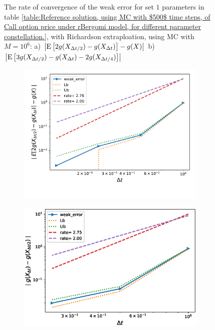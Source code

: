 \documentclass[11pt]{article}
\newcommand{\expt}[1]{\mathrm{E}\left[#1\right]}
\begin{document}
\begin{figure}[h!]
	\caption{The rate of convergence of the weak error for set $1$ parameters in table \ref{table:Reference solution, using MC with $500$ time steps, of Call option price under rBergomi model, for different parameter constellation.}, with Richardson extraploation, using MC with $M=10^6$: a) $\abs{\expt{2 g(X_{\Delta t/2}) -g(X_{\Delta t})}-g(X)}$  b) $\abs{\expt{3 g(X_{\Delta t/2})-g(X_{\Delta t})-2 g(X_{\Delta t/4})}}$ }
	\label{fig:Weak_rate_H_043_with_rich}
\end{figure}

\begin{figure}[h!]
	\centering
	\begin{subfigure}{.4\textwidth}
		\centering
		\includegraphics[width=1\linewidth]{./figures/rBergomi_weak_error_rates/with_richardson/H_007/weak_convergence_order_Bergomi_H_007_K_1_richardson_relative_M_10_6}
		\caption{}
		\label{fig:sub3}
	\end{subfigure}%
	\begin{subfigure}{.4\textwidth}
		\centering
		\includegraphics[width=1\linewidth]{./figures/rBergomi_weak_error_rates/with_richardson/H_007/weak_convergence_order_differences_Bergomi_H_007_K_1_richardson_relative_M_10_6}
		\caption{}
		\label{fig:sub4}
	\end{subfigure}
	

\end{figure}
\end{document}
